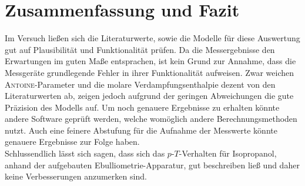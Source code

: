 \section{Zusammenfassung und Fazit}
\label{sec:zusammenfassung}

Im Versuch ließen sich die Literaturwerte, sowie die Modelle für diese Auswertung gut auf Plausibilität und Funktionalität prüfen. Da die Messergebnisse den Erwartungen im guten Maße entsprachen, ist kein Grund zur Annahme, dass die Messgeräte grundlegende Fehler in ihrer Funktionalität aufweisen. Zwar weichen \textsc{Antoine}-Parameter und die molare Verdampfungsenthalpie dezent von den Literaturwerten ab, zeigen jedoch aufgrund der geringen Abweichungen die gute Präzision  des Modells auf. Um noch genauere Ergebnisse zu erhalten könnte andere Software geprüft werden, welche womöglich andere Berechnungsmethoden nutzt. Auch eine feinere Abstufung für die Aufnahme der Messwerte könnte genauere Ergebnisse zur Folge haben. \\
Schlussendlich lässt sich sagen, dass sich das $p$-$T$-Verhalten für Isopropanol, anhand der aufgebauten Ebulliometrie-Apparatur, gut beschreiben ließ und daher keine Verbesserungen anzumerken sind.